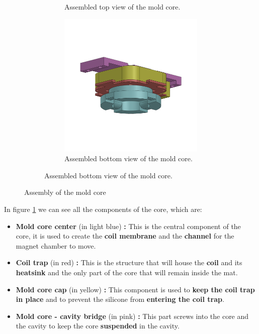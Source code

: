 \begin{itemize}
\begin{figure}
\begin{subfigure}[b]{0.6\textwidth}
\begin{subfigure}[b]{0.475\textwidth}
                \caption{Assembled top view of the mold core.}
            \end{subfigure}
            \hfill
            \begin{subfigure}[b]{0.475\textwidth}
                \centering
                \includegraphics[width = 1\linewidth]{Chapters/Chapter5/Flexible_Mat_Prototypes/Figures/mold_core_btm.PNG}
                \caption{Assembled bottom view of the mold core.}
            \end{subfigure}
        \end{subfigure}
        \caption{Assembly of the mold core}
        \label{fig: mat_mold_core}
    \end{figure}

    In figure \ref{fig: mat_mold_core} we can see all the components of the core, which are:
    \begin{itemize}
        \item \textbf{Mold core center } (in light blue) \textbf{: } This is the central component of the core, it is used to create the \textbf{coil membrane} and the \textbf{channel} for the magnet chamber to move.
        \item \textbf{Coil trap} (in red) \textbf{: } This is the structure that will house the \textbf{coil} and its \textbf{heatsink} and the only part of the core that will remain inside the mat.
        \item \textbf{Mold core cap } (in yellow) \textbf{: } This component is used to \textbf{keep the coil trap in place} and to prevent the silicone from \textbf{entering the coil trap}.
        \item \textbf{Mold core - cavity bridge } (in pink) \textbf{: } This part screws into the core and the cavity to keep the core \textbf{suspended} in the cavity.
    \end {itemize}
    
\end{itemize}

